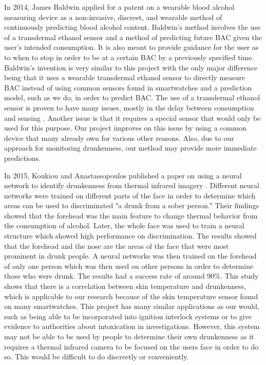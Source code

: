 In 2014, James Baldwin applied for a patent on a wearable blood alcohol measuring device \cite{Baldwin:2014} as a non-invasive, discreet, and wearable method of continuously predicting blood alcohol content. Baldwin's method involves the use of a transdermal ethanol sensor and a method of predicting future BAC given the user's intended consumption. It is also meant to provide guidance for the user as to when to stop in order to be at a certain BAC by a previously specified time. Baldwin's invention is very similar to this project with the only major difference being that it uses a wearable transdermal ethanol sensor to directly measure BAC instead of using common sensors found in smartwatches and a prediction model, such as we do, in order to predict BAC. The use of a transdermal ethanol sensor is proven to have many issues, mostly in the delay between consumption and sensing \cite{Webster:2007}. Another issue is that it requires a special sensor that would only be used for this purpose. Our project improves on this issue by using a common device that many already own for various other reasons. Also, due to our approach for monitoring drunkenness, our method may provide more immediate predictions.  

In 2015, Koukiou and Anastassopoulos published a paper on using a neural network to identify drunkenness from thermal infrared imagery \cite{Koukiou:2015}. Different neural networks were trained on different parts of the face in order to determine which areas can be used to discriminated "a drunk from a sober person." Their findings showed that the forehead was the main feature to change thermal behavior from the consumption of alcohol. Later, the whole face was used to train a neural structure which showed high performance on discrimination. The results showed that the forehead and the nose are the areas of the face that were most prominent in drunk people. A neural networks was then trained on the forehead of only one person which was then used on other persons in order to determine those who were drunk. The results had a success rate of around 90\%. This study shows that there is a correlation between skin temperature and drunkenness, which is applicable to our research because of the skin temperature sensor found on many smartwatches. This project has many similar applications as our would, such as being able to be incorporated into ignition interlock systems or to give evidence to authorities about intoxication in investigations. However, this system may not be able to be used by people to determine their own drunkenness as it requires a thermal infrared camera to be focused on the users face in order to do so. This would be difficult to do discreetly or conveniently. 

